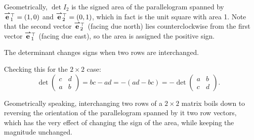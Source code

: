 \documentclass{ximera}
\begin{document}
Geometrically, $\det I_2$ is the signed area of the parallelogram
spanned by ${\overset{\boldsymbol{\rightharpoonup}}{\mathbf{e}}}\hspace{0in}_1^\top = (1, 0)$ and
${\overset{\boldsymbol{\rightharpoonup}}{\mathbf{e}}}\hspace{0in}_2^\top = (0, 1)$, which in fact is the unit square with
area 1. Note that the second vector ${\overset{\boldsymbol{\rightharpoonup}}{\mathbf{e}}}\hspace{0in}_2^\top$ (facing due
north) lies counterclockwise from the first vector
${\overset{\boldsymbol{\rightharpoonup}}{\mathbf{e}}}\hspace{0in}_1^\top$ (facing due east), so the area is assigned the
positive sign.

\begin{image}[2in]
\end{image}



\begin{proposition}
  The determinant changes signs when two rows are interchanged.
\end{proposition}

Checking this for the $2 \times 2$ case:
\[
  \det
  \begin{pmatrix}
    c & d \\
    a & b
  \end{pmatrix}
  = bc - ad = -(ad - bc) =
  - \det
  \begin{pmatrix}
    a & b \\
    c & d
  \end{pmatrix}.
\]

Geometrically speaking, interchanging two rows of a $2 \times 2$ matrix
boils down to reversing the orientation of the parallelogram spanned
by it two row vectors, which has the very effect of changing the sign
of the area, while keeping the magnitude unchanged.
\end{document}
